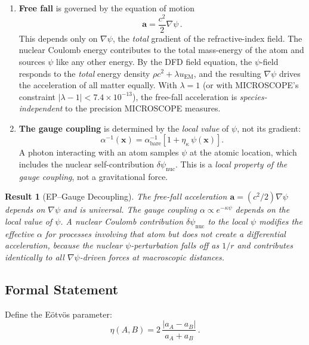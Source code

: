 \documentclass[aps,prd,twocolumn,superscriptaddress,nofootinbib]{revtex4-2}
\newcommand{\avec}{\mathbf{a}}
\newcommand{\ee}[1]{\times 10^{#1}}
\newcommand{\kap}{\kappa}
\newcommand{\lam}{\lambda}
\newcommand{\ainv}{\alpha^{-1}}
\newcommand{\dpsi}{\delta\psi}
\newtheorem{result}{Result}
\begin{document}
\begin{enumerate}[nosep]
\item \textbf{Free fall} is governed by the equation of motion
\begin{equation}\label{eq:free-fall}
\avec = \frac{c^2}{2}\nabla\psi\,.
\end{equation}
This depends only on $\nabla\psi$, the \emph{total} gradient of the
refractive-index field.  The nuclear Coulomb energy contributes to
the total mass-energy of the atom and sources $\psi$ like any other
energy.  By the DFD field equation, the $\psi$-field responds to the
\emph{total} energy density $\rho c^2 + \lam u_{\mathrm{EM}}$, and
the resulting $\nabla\psi$ drives the acceleration of all matter
equally.  With $\lam = 1$ (or with MICROSCOPE's constraint
$|\lam - 1| < 7.4\ee{-13}$), the free-fall acceleration is
\emph{species-independent} to the precision MICROSCOPE measures.

\item \textbf{The gauge coupling} is determined by the \emph{local
value} of $\psi$, not its gradient:
\begin{equation}
\ainv(\mathbf{x}) = \ainv_{\mathrm{bare}}
\left[1 + \eta_\kap\,\psi(\mathbf{x})\right].
\end{equation}
A photon interacting with an atom samples $\psi$ at the atomic
location, which includes the nuclear self-contribution
$\dpsi_{\mathrm{nuc}}$.  This is a \emph{local property of the
gauge coupling}, not a gravitational force.
\end{enumerate}

\begin{result}[EP--Gauge Decoupling]
The free-fall acceleration $\avec = (c^2/2)\nabla\psi$ depends on
$\nabla\psi$ and is universal.  The gauge coupling $\alpha \propto
e^{-\kap\psi}$ depends on the local \emph{value} of $\psi$.  A
nuclear Coulomb contribution $\dpsi_{\mathrm{nuc}}$ to the local
$\psi$ modifies the effective $\alpha$ for processes involving that
atom but does not create a differential acceleration, because the
nuclear $\psi$-perturbation falls off as $1/r$ and contributes
identically to all $\nabla\psi$-driven forces at macroscopic distances.
\end{result}

\subsection{Formal Statement}

Define the E\"otv\"os parameter:
\begin{equation}
\eta(A,B) = 2\,\frac{|a_A - a_B|}{a_A + a_B}\,.
\end{equation}
\end{document}
